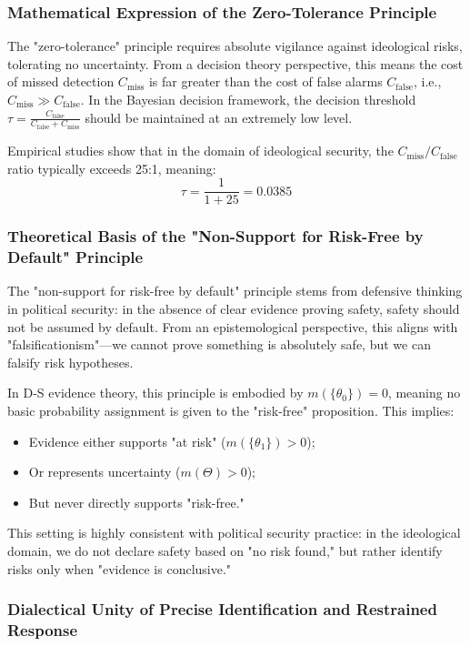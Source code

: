 \documentclass[11pt,a4paper]{report}
\begin{document}
\subsubsection{Mathematical Expression of the Zero-Tolerance Principle}

The "zero-tolerance" principle requires absolute vigilance against ideological risks, tolerating no uncertainty. From a decision theory perspective, this means the cost of missed detection $C_{\text{miss}}$ is far greater than the cost of false alarms $C_{\text{false}}$, i.e., $C_{\text{miss}} \gg C_{\text{false}}$. In the Bayesian decision framework, the decision threshold $\tau = \frac{C_{\text{false}}}{C_{\text{false}} + C_{\text{miss}}}$ should be maintained at an extremely low level.

Empirical studies show that in the domain of ideological security, the $C_{\text{miss}}/C_{\text{false}}$ ratio typically exceeds 25:1, meaning:
\[
\tau = \frac{1}{1+25} = 0.0385
\]

\subsubsection{Theoretical Basis of the "Non-Support for Risk-Free by Default" Principle}

The "non-support for risk-free by default" principle stems from defensive thinking in political security: in the absence of clear evidence proving safety, safety should not be assumed by default. From an epistemological perspective, this aligns with "falsificationism"—we cannot prove something is absolutely safe, but we can falsify risk hypotheses.

In D-S evidence theory, this principle is embodied by $m(\{\theta_0\}) = 0$, meaning no basic probability assignment is given to the "risk-free" proposition. This implies:
\begin{itemize}
    \item Evidence either supports "at risk" ($m(\{\theta_1\}) > 0$);
    \item Or represents uncertainty ($m(\Theta) > 0$);
    \item But never directly supports "risk-free."
\end{itemize}

This setting is highly consistent with political security practice: in the ideological domain, we do not declare safety based on "no risk found," but rather identify risks only when "evidence is conclusive."

\subsubsection{Dialectical Unity of Precise Identification and Restrained Response}
\end{document}
